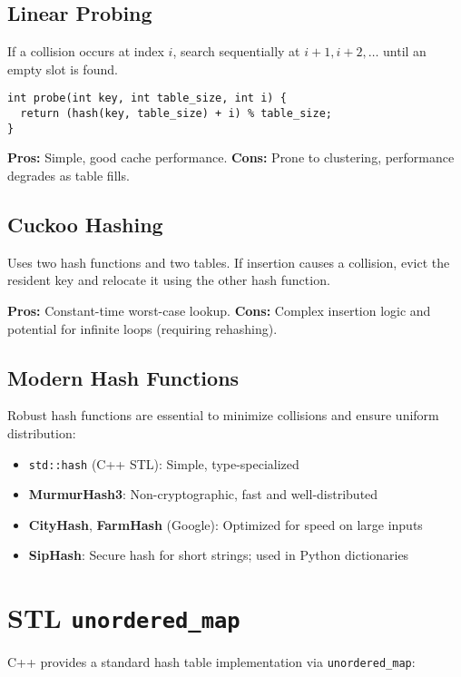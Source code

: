 \documentclass{article}
\begin{document}
\subsection{Linear Probing}
If a collision occurs at index $i$, search sequentially at $i+1, i+2, \dots$ until an empty slot is found.

\begin{lstlisting}[style=cppstyle]
int probe(int key, int table_size, int i) {
  return (hash(key, table_size) + i) % table_size;
}
\end{lstlisting}

\textbf{Pros:} Simple, good cache performance.  
\textbf{Cons:} Prone to clustering, performance degrades as table fills.

\subsection{Cuckoo Hashing}
Uses two hash functions and two tables. If insertion causes a collision, evict the resident key and relocate it using the other hash function.

\textbf{Pros:} Constant-time worst-case lookup.  
\textbf{Cons:} Complex insertion logic and potential for infinite loops (requiring rehashing).

\subsection{Modern Hash Functions}

Robust hash functions are essential to minimize collisions and ensure uniform distribution:

\begin{itemize}
  \item \texttt{std::hash} (C++ STL): Simple, type-specialized
  \item \textbf{MurmurHash3}: Non-cryptographic, fast and well-distributed
  \item \textbf{CityHash}, \textbf{FarmHash} (Google): Optimized for speed on large inputs
  \item \textbf{SipHash}: Secure hash for short strings; used in Python dictionaries
\end{itemize}

\section{STL \texttt{unordered\_map}}

C++ provides a standard hash table implementation via \texttt{unordered\_map}:
\end{document}
